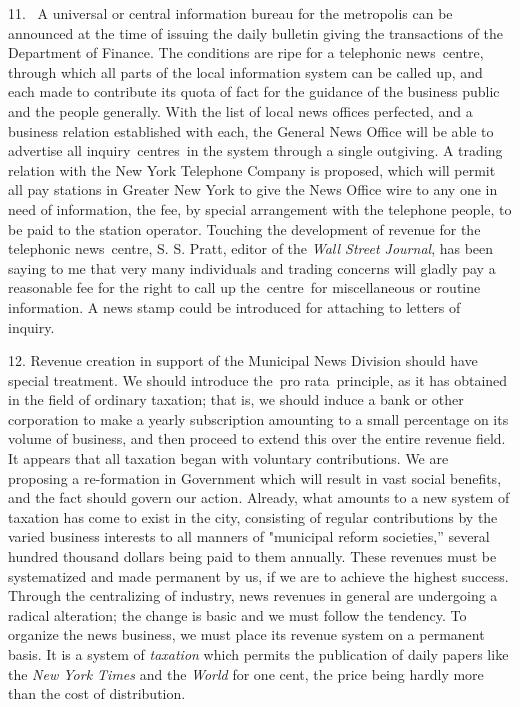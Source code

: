 \documentclass[openany,nobib]{tufte-book}
\begin{document}
11. ~A universal or central information bureau for the metropolis can be
announced at the time of issuing the daily bulletin giving the
transactions of the Department of Finance. The conditions are ripe for a
telephonic news~centre, through which all parts of the local information
system can be called up, and each made to contribute its quota of fact
for the guidance of the business public and the people generally. With
the list of local news offices perfected, and a business relation
established with each, the General News Office will be able to advertise
all inquiry~centres~in the system through a single outgiving. A trading
relation with the New York Telephone Company is proposed, which will
permit all pay stations in Greater New York to give the News Office wire
to any one in need of information, the fee, by special arrangement with
the telephone people, to be paid to the station operator. Touching the
development of revenue for the telephonic news~centre, S. S. Pratt,
editor of the \emph{Wall Street Journal}, has been saying to me that
very many individuals and trading concerns will gladly pay a reasonable
fee for the right to call up the~centre~for miscellaneous or routine
information. A news stamp could be introduced for attaching to letters
of inquiry.~

12. Revenue creation in support of the Municipal News Division should
have special treatment. We should introduce the~pro rata~principle, as
it has obtained in the field of ordinary taxation; that is, we should
induce a bank or other corporation to make a yearly subscription
amounting to a small percentage on its volume of business, and then
proceed to extend this over the entire revenue field. It appears that
all taxation began with voluntary contributions. We are proposing a
re-formation in Government which will result in vast social benefits,
and the fact should govern our action. Already, what amounts to a new
system of taxation has come to exist in the city, consisting of regular
contributions by the varied business interests to all manners of
"municipal reform societies,'' several hundred thousand dollars being
paid to them annually. These revenues must be systematized and made
permanent by us, if we are to achieve the highest success. Through the
centralizing of industry, news revenues in general are undergoing a
radical alteration; the change is basic and we must follow the tendency.
To organize the news business, we must place its revenue system on a
permanent basis. It is a system of \emph{taxation} which permits the
publication of daily papers like the \emph{New York Times} and the
\emph{World} for one cent, the price being hardly more than the cost of
distribution.~
\end{document}
